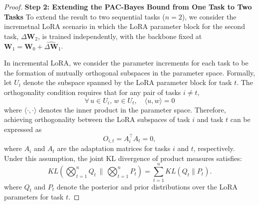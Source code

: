\documentclass[letterpaper]{article} %
\begin{document}
\begin{proof}
\textbf{Step 2: Extending the PAC-Bayes Bound from One Task to Two Tasks} To extend the result to two sequential tasks ($n=2$), we consider the incremetnal LoRA scenario in which the LoRA parameter block for the second task, $\Delta\mathbf{W}_2$, is trained independently, with the backbone fixed at $\mathbf{W}_1 = \mathbf{W}_0 + \hat{\Delta\mathbf{W}}_1$. 


In incremental LoRA, we consider the parameter increments for each task to be the formation of mutually orthogonal subspaces in the parameter space. Formally, let $U_t$ denote the subspace spanned by the LoRA parameter block for task $t$. The orthogonality condition requires that for any pair of tasks $i \neq t$,
$$ \forall\, u \in U_i,\, w \in U_t, \quad \langle u, w \rangle = 0$$
where $\langle \cdot, \cdot \rangle$ denotes the inner product in the parameter space. Therefore, achieving orthogonality between the LoRA subspaces of task $i$ and task $t$ can be expressed as
$${O}_{i,t} = A_i^{\top} A_t = 0,$$
where $A_i$ and $A_t$ are the adaptation matrices for tasks $i$ and $t$, respectively. Under this assumption, the joint KL divergence of product measures satisfies:   \begin{equation}
      KL\left(\bigotimes_{t=1}^n Q_t \, \bigg\| \, \bigotimes_{t=1}^n P_t\right) = \sum_{t=1}^n KL(Q_t \| P_t).
  \end{equation}
where $Q_t$ and $P_t$ denote the posterior and prior distributions over the LoRA parameters for task $t$.




\end{proof}
\end{document}
